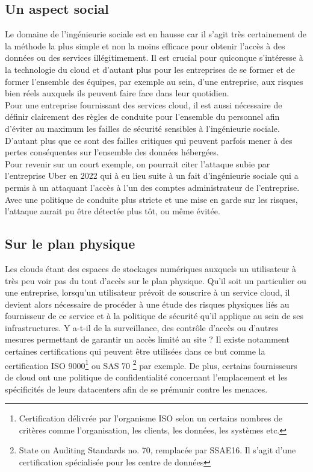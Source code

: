 \documentclass[a4paper, 12pt]{article}
\begin{document}
\begin{spacing}{1.1}
      \subsection{Un aspect social}
      Le domaine de l'ingénieurie sociale est en hausse car il s'agit très
      certainement de la méthode la plus simple et non la moins efficace pour
      obtenir l'accès à des données ou des services illégitimement. Il est
      crucial pour quiconque s'intéresse à la technologie du cloud et d'autant
      plus pour les entreprises de se former et de former l'ensemble des
      équipes, par exemple au sein, d'une entreprise, aux risques bien réels
      auxquels ils peuvent faire face dans leur quotidien. \\

      Pour une entreprise fournissant des services cloud, il est aussi
      nécessaire de définir clairement des règles de conduite pour l'ensemble du
      personnel afin d'éviter au maximum les failles de sécurité sensibles à
      l'ingénieurie sociale. D'autant plus que ce sont des failles critiques qui
      peuvent parfois mener à des pertes conséquentes sur l'ensemble des données
      hébergées. \\

      Pour revenir sur un court exemple, on pourrait citer l'attaque subie par
      l'entreprise Uber en 2022 qui à eu lieu suite à un fait d'ingénieurie
      sociale qui a permis à un attaquant l'accès à l'un des comptes
      administrateur de l'entreprise. Avec une politique de conduite plus
      stricte et une mise en garde sur les risques, l'attaque aurait pu être
      détectée plus tôt, ou même évitée. \\

    \subsection{Sur le plan physique}
      Les clouds étant des espaces de stockages numériques auxquels un
      utilisateur à très peu voir pas du tout d'accès sur le plan physique.
      Qu'il soit un particulier ou une entreprise, lorsqu'un utilisateur
      prévoit de souscrire à un service cloud, il devient alors nécessaire de
      procéder à une étude des risques physiques liés au fournisseur de
      ce service et à la politique de sécurité qu'il applique au sein de ses
      infrastructures. Y a-t-il de la surveillance, des contrôle d'accès ou
      d'autres mesures permettant de garantir un accès limité au site ? Il
      existe notamment certaines certifications qui peuvent être utilisées dans
      ce but comme la certification ISO 9000\footnote{Certification délivrée
      par l'organisme ISO selon un certains nombres de critères comme
      l'organisation, les clients, les données, les systèmes etc.} ou SAS 70
      \footnote{State on Auditing Standards no. 70, remplacée par SSAE16. Il
      s'agit d'une certification spécialisée pour les centre de données} par
      exemple. De plus, certains fournisseurs de cloud ont une politique de
      confidentialité concernant l'emplacement et les spécificités de leurs
      datacenters afin de se prémunir contre les menaces. \\


\end{spacing}
\end{document}

